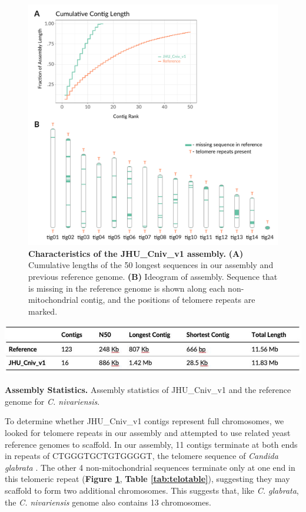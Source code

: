 \begin{figure}[!hb]
\centering
\includegraphics[width = 1\linewidth,keepaspectratio]{figure/asms.pdf}
\caption[Characteristics of the JHU\_Cniv\_v1 assembly]{{\bf Characteristics of the JHU\_Cniv\_v1 assembly.} {\bf (A)} Cumulative lengths of the 50 longest sequences in our assembly and previous reference genome. {\bf (B)} Ideogram of assembly. Sequence that is missing in the reference genome is shown along each non-mitochondrial contig, and the positions of telomere repeats are marked. }
\label{fig:asms}
\end{figure}


\begin{table}[!hb]
\centering
\includegraphics[width = 1\linewidth,keepaspectratio]{figure/asmstats.pdf}
\caption[Assembly Statistics]{{\bf Assembly Statistics.} Assembly statistics of JHU\_Cniv\_v1 and the reference genome for \textit{C. nivariensis}. }
\label{tab:asmstats}
\end{table}


To determine whether JHU\_Cniv\_v1 contigs represent full chromosomes, we looked for telomere repeats in our assembly and attempted to use related yeast reference genomes to scaffold. In our assembly, 11 contigs terminate at both ends in repeats of CTGGGTGCTGTGGGGT, the telomere sequence of \textit{Candida glabrata} \citep{McEachern1994-mf}. The other 4 non-mitochondrial sequences terminate only at one end in this telomeric repeat ({\bf Figure \ref{fig:asms}}, {\bf Table \ref{tab:telotable}}), suggesting they may scaffold to form two additional chromosomes. This suggests that, like \textit{C. glabrata}, the \textit{C. nivariensis} genome also contains 13 chromosomes.


